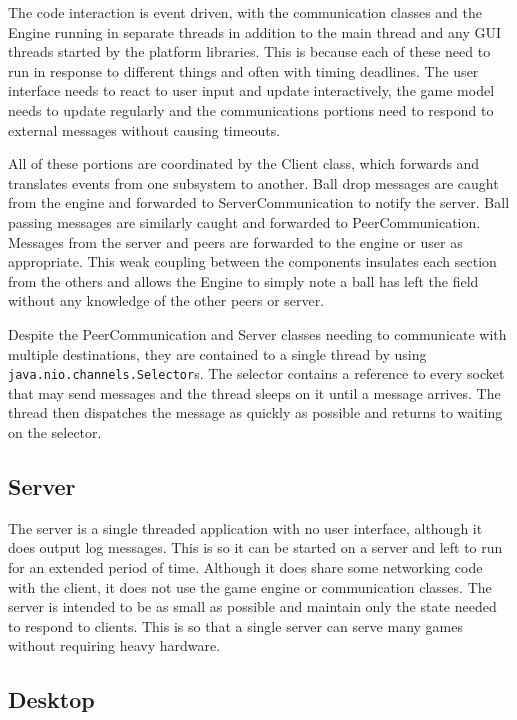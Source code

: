 \documentclass{sig-alternate}
\begin{document}
The code interaction is event driven, with the communication classes and
the Engine running in separate threads in addition to the main thread and
any GUI threads started by the platform libraries.  This is because each of
these need to run in response to different things and often with timing
deadlines.  The user interface needs to react to user input and update
interactively, the game model needs to update regularly and the
communications portions need to respond to external messages without
causing timeouts.

All of these portions are coordinated by the Client class, which forwards
and translates events from one subsystem to another.  Ball drop messages
are caught from the engine and forwarded to ServerCommunication to notify
the server.  Ball passing messages are similarly caught and forwarded to
PeerCommunication.  Messages from the server and peers are forwarded to the
engine or user as appropriate.  This weak coupling between the components
insulates each section from the others and allows the Engine to simply note
a ball has left the field without any knowledge of the other peers or
server.

Despite the PeerCommunication and Server classes needing to communicate
with multiple destinations, they are contained to a single thread by using
\texttt{java.nio.channels.Selector}s.  The selector contains a reference to
every socket that may send messages and the thread sleeps on it until a
message arrives.  The thread then dispatches the message as quickly as
possible and returns to waiting on the selector.

\subsection{Server}

The server is a single threaded application with no user interface,
although it does output log messages.  This is so it can be started on a
server and left to run for an extended period of time.  Although it does
share some networking code with the client, it does not use the game engine
or communication classes.  The server is intended to be as small as
possible and maintain only the state needed to respond to clients.  This is
so that a single server can serve many games without requiring heavy
hardware.

\subsection{Desktop}
\end{document}
